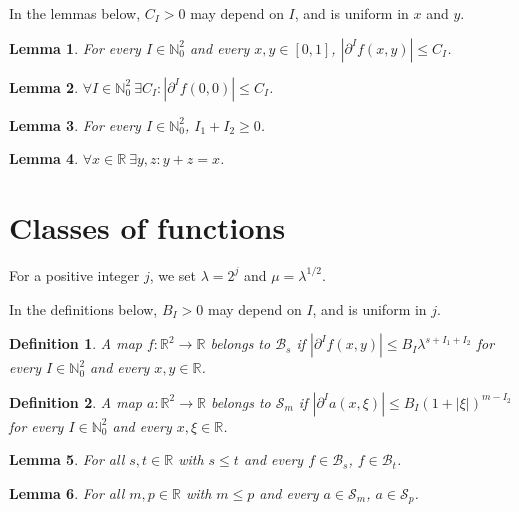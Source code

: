 \documentclass{article}
\newtheorem{lemma}{Lemma}
\newtheorem{definition}{Definition}
\begin{document}
In the lemmas below, $C_I>0$ may depend on $I$, and is uniform in $x$ and $y$.

\begin{lemma}\label{derivatives}
For every $I\in\mathbb N_0^2$ and every $x,y\in[0,1]$, $|\partial^If(x,y)|\le C_I$.
\end{lemma}

\begin{lemma}\label{explicit}
$\forall I\in\mathbb N_0^2\ \exists C_I: |\partial^If(0,0)|\le C_I$.
\end{lemma}

\begin{lemma}\label{components}
For every $I\in\mathbb N_0^2$, $I_1+I_2\ge0$.
\end{lemma}

\begin{lemma}\label{sums}
$\forall x\in\mathbb R\ \exists y,z: y+z=x$.
\end{lemma}

\section{Classes of functions}

For a positive integer $j$, we set $\lambda=2^{j}$ and $\mu=\lambda^{1/2}$.

In the definitions below, $B_I>0$ may depend on $I$, and is uniform in $j$.

\begin{definition}\label{bernstein}
A map $f:\mathbb R^2\to\mathbb R$ belongs to $\mathcal B_s$ if $|\partial^If(x,y)|\le B_I\lambda^{s+I_1+I_2}$ for every $I\in\mathbb N_0^2$ and every $x,y\in\mathbb R$.
\end{definition}

\begin{definition}\label{symbols}
A map $a:\mathbb R^2\to\mathbb R$ belongs to $\mathcal S_m$ if $|\partial^Ia(x,\xi)|\le B_I(1+|\xi|)^{m-I_2}$ for every $I\in\mathbb N_0^2$ and every $x,\xi\in\mathbb R$.
\end{definition}

\begin{lemma}\label{bernstein-inclusion}
For all $s,t\in\mathbb R$ with $s\le t$ and every $f\in\mathcal B_s$, $f\in\mathcal B_t$.
\end{lemma}

\begin{lemma}\label{symbol-inclusion}
For all $m,p\in\mathbb R$ with $m\le p$ and every $a\in\mathcal S_m$, $a\in\mathcal S_p$.
\end{lemma}
\end{document}
